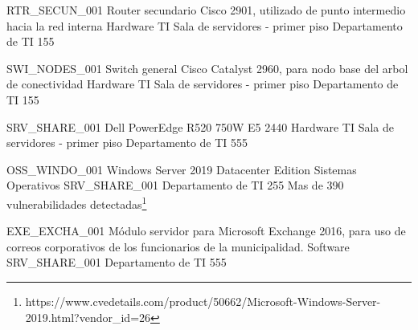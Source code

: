 \documentclass[11pt]{utalcaDoc}
\begin{document}
\informationResource
{RTR\_SECUN\_001}
{Router secundario Cisco 2901, utilizado de punto intermedio hacia la red interna}
{Hardware TI}
{Sala de servidores - primer piso}
{Departamento de TI}
{1}{5}{5}
{
	\threatResourceLost
	\threatHumanIntervention
	\threatRemoteIntervention
	\threatNaturalDisaster
	\threatHumanDisaster
}

\informationResource
{SWI\_NODES\_001}
{Switch general Cisco Catalyst 2960, para nodo base del arbol de conectividad}
{Hardware TI}
{Sala de servidores - primer piso}
{Departamento de TI}
{1}{5}{5}
{
	\threatResourceLost
	\threatHumanIntervention
	\threatRemoteIntervention
	\threatNaturalDisaster
	\threatHumanDisaster
}

\informationResource
{SRV\_SHARE\_001}
{Dell PowerEdge R520 750W E5 2440}
{Hardware TI}
{Sala de servidores - primer piso}
{Departamento de TI}
{5}{5}{5}
{
	\threatHumanIntervention
	\threatRemoteIntervention
	\threatNaturalDisaster
	\threatHumanDisaster
	\threatInterest
}


\informationResource
{OSS\_WINDO\_001}
{Windows Server 2019 Datacenter Edition}
{Sistemas Operativos}
{SRV_SHARE_001}
{Departamento de TI}
{2}{5}{5}
{
	Mas de 390 vulnerabilidades detectadas\footnote{https://www.cvedetails.com/product/50662/Microsoft-Windows-Server-2019.html?vendor_id=26}\\
	\threatHumanIntervention
	\threatRemoteIntervention
}


\informationResource
{EXE\_EXCHA\_001}
{Módulo servidor para Microsoft Exchange 2016, para uso de correos corporativos de los funcionarios de la municipalidad.}
{Software}
{SRV_SHARE_001}
{Departamento de TI}
{5}{5}{5}
{
	\threatHumanIntervention
	\threatRemoteIntervention
	\threatNaturalDisaster
	\threatHumanDisaster
	\threatInterest
}
\end{document}
